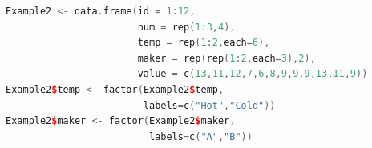 \begin{lstlisting}[language=c++,label={code:23_09},caption={Converting to a data frame}]
Example2 <- data.frame(id = 1:12,
                       num = rep(1:3,4),
                       temp = rep(1:2,each=6),
                       maker = rep(rep(1:2,each=3),2),
                       value = c(13,11,12,7,6,8,9,9,9,13,11,9))
Example2$temp <- factor(Example2$temp,
                        labels=c("Hot","Cold"))
Example2$maker <- factor(Example2$maker,
                         labels=c("A","B"))
\end{lstlisting}
